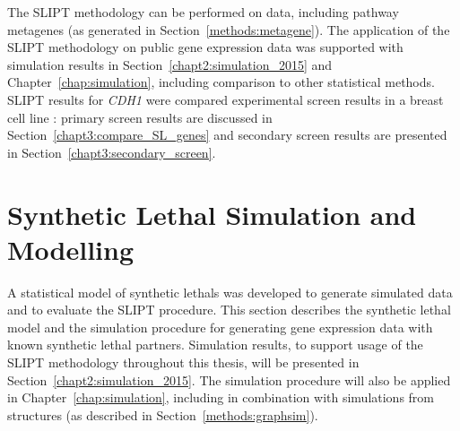 The \gls{SLIPT} methodology can be performed on  data, including pathway \glspl{metagene} (as generated in Section~\ref{methods:metagene}). The application of the \gls{SLIPT} methodology on public \gls{gene expression} data was supported with simulation results in Section~\ref{chapt2:simulation_2015} and Chapter~\ref{chap:simulation}, including comparison to other statistical methods. \gls{SLIPT} results for \textit{CDH1} were compared experimental screen results in a breast cell line \citep{Telford2015}: primary screen results are discussed in Section~\ref{chapt3:compare_SL_genes} and secondary screen results are presented in Section~\ref{chapt3:secondary_screen}.



\FloatBarrier

\section{Synthetic Lethal Simulation and Modelling} \label{methods:simulation_SL_expression} 

A statistical model of \glspl{synthetic lethal} was developed to generate simulated data and to evaluate the \gls{SLIPT} procedure. This section describes the \gls{synthetic lethal} model and the simulation procedure for generating \gls{gene expression} data with known \gls{synthetic lethal} partners. Simulation results, to support usage of the \gls{SLIPT} methodology throughout this thesis, will be presented in Section~\ref{chapt2:simulation_2015}. The simulation procedure will also be applied in Chapter~\ref{chap:simulation}, including in combination with simulations from  structures (as described in Section~\ref{methods:graphsim}).

